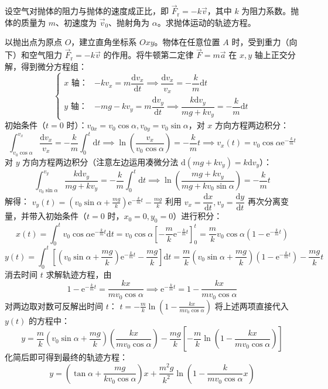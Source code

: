 \begin{exercise}
设空气对抛体的阻力与抛体的速度成正比，即 $\vec{F}_{\text{r}} = -k\vec{v}$，其中 $k$ 为阻力系数。抛体的质量为 $m$、初速度为 $\vec{v}_0$、抛射角为 $\alpha$。求抛体运动的轨迹方程。
\end{exercise}
\begin{solution}
以抛出点为原点 $O$，建立直角坐标系 $Oxy$。物体在任意位置 $A$ 时，受到重力（向下）和空气阻力 $\vec{F}_{\text{r}} = -k\vec{v}$ 的作用。将牛顿第二定律 $\vec{F} = m\vec{a}$ 在 $x, y$ 轴上正交分解，得到微分方程组：
\[\begin{cases}
\text{$x$ 轴：} & -kv_x = m \dfrac{\mathrm{d}v_x}{\mathrm{d}t} \implies\dfrac{\mathrm{d}v_x}{v_x} = -\dfrac{k}{m}\mathrm{d}t\\
\text{$y$ 轴：} & -mg - kv_y = m \dfrac{\mathrm{d}v_y}{\mathrm{d}t}\implies \dfrac{k\mathrm{d}v_y}{mg + kv_y} = -\dfrac{k}{m}\mathrm{d}t
\end{cases}\]
初始条件（$t=0$ 时）：$v_{0x} = v_0\cos\alpha,v_{0y} = v_0\sin\alpha$，对 $x$ 方向方程两边积分：
\[\int_{v_0\cos\alpha}^{v_x} \frac{\mathrm{d}v_x}{v_x} = -\frac{k}{m}\int_{0}^{t}\mathrm{d}t \implies \ln\left(\frac{v_x}{v_0\cos\alpha}\right) = -\frac{k}{m}t\implies v_x(t) = v_0\cos\alpha \mathrm{e}^{-\frac{k}{m}t}\]
对 $y$ 方向方程两边积分（注意左边运用凑微分法 $\mathrm{d}(mg+kv_y) = k\mathrm{d}v_y$）：
$$\int_{v_0\sin\alpha}^{v_y} \frac{k\mathrm{d}v_y}{mg + kv_y} = -\frac{k}{m}\int_{0}^{t}\mathrm{d}t \implies \ln\left(\frac{mg + kv_y}{mg + kv_0\sin\alpha}\right) = -\frac{k}{m}t$$解得： \(v_y(t) = \left(v_0\sin\alpha + \frac{mg}{k}\right)\mathrm{e}^{-\frac{k}{m}t} - \frac{mg}{k}\) 
利用 $v_x = \dfrac{\mathrm{d}x}{\mathrm{d}t}, v_y = \dfrac{\mathrm{d}y}{\mathrm{d}t}$ 再次分离变量，并带入初始条件（$t=0$ 时，$x_0=0, y_0=0$）进行积分：
$$x(t) = \int_{0}^{t} v_0\cos\alpha \mathrm{e}^{-\frac{k}{m}t} \mathrm{d}t = v_0\cos\alpha \left[ -\frac{m}{k}\mathrm{e}^{-\frac{k}{m}t} \right]_0^t = \frac{m}{k}v_0\cos\alpha\left(1 - \mathrm{e}^{-\frac{k}{m}t}\right)$$
$$y(t) = \int_{0}^{t} \left[\left(v_0\sin\alpha + \frac{mg}{k}\right)\mathrm{e}^{-\frac{k}{m}t} - \frac{mg}{k}\right] \mathrm{d}t = \frac{m}{k}\left(v_0\sin\alpha + \frac{mg}{k}\right)\left(1 - \mathrm{e}^{-\frac{k}{m}t}\right) - \frac{mg}{k}t$$
消去时间 $t$ 求解轨迹方程，由
$$1 - \mathrm{e}^{-\frac{k}{m}t} = \frac{kx}{mv_0\cos\alpha} \implies \mathrm{e}^{-\frac{k}{m}t} = 1 - \frac{kx}{mv_0\cos\alpha}$$对两边取对数可反解出时间 $t$： \(t = -\frac{m}{k}\ln\left(1 - \frac{kx}{mv_0\cos\alpha}\right)\) 将上述两项直接代入 $y(t)$ 的方程中：$$y = \frac{m}{k}\left(v_0\sin\alpha + \frac{mg}{k}\right)\left(\frac{kx}{mv_0\cos\alpha}\right) - \frac{mg}{k}\left[-\frac{m}{k}\ln\left(1 - \frac{kx}{mv_0\cos\alpha}\right)\right]$$化简后即可得到最终的轨迹方程：$$y = \left(\tan\alpha + \frac{mg}{kv_0\cos\alpha}\right)x + \frac{m^2g}{k^2}\ln\left(1 - \frac{k}{mv_0\cos\alpha}x\right)$$
\end{solution}

